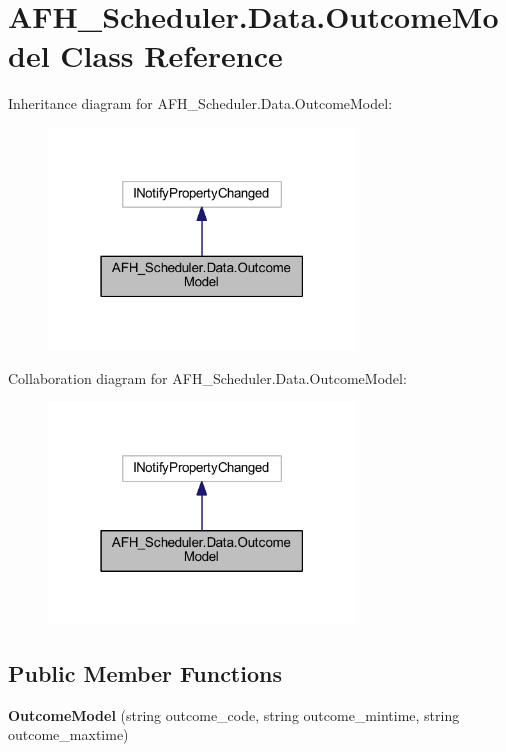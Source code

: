\section{A\+F\+H\+\_\+\+Scheduler.\+Data.\+Outcome\+Model Class Reference}
\label{class_a_f_h___scheduler_1_1_data_1_1_outcome_model}


Inheritance diagram for A\+F\+H\+\_\+\+Scheduler.\+Data.\+Outcome\+Model\+:
\nopagebreak
\begin{figure}[H]
\begin{center}
\leavevmode
\includegraphics[width=231pt]{class_a_f_h___scheduler_1_1_data_1_1_outcome_model__inherit__graph}
\end{center}
\end{figure}


Collaboration diagram for A\+F\+H\+\_\+\+Scheduler.\+Data.\+Outcome\+Model\+:
\nopagebreak
\begin{figure}[H]
\begin{center}
\leavevmode
\includegraphics[width=231pt]{class_a_f_h___scheduler_1_1_data_1_1_outcome_model__coll__graph}
\end{center}
\end{figure}
\subsection*{Public Member Functions}
\begin{DoxyCompactItemize}
\item 
\textbf{ Outcome\+Model} (string outcome\+\_\+code, string outcome\+\_\+mintime, string outcome\+\_\+maxtime)
\end{DoxyCompactItemize}
